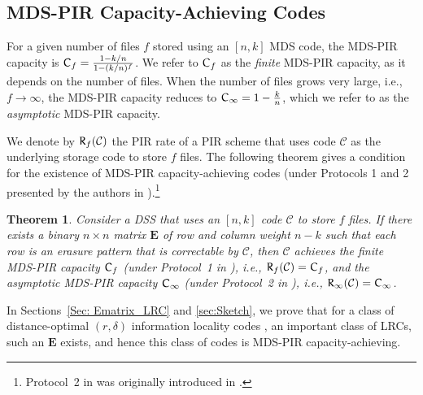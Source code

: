 \documentclass[twocolumn,conference]{IEEEtran}
\newtheorem{theorem}{Theorem}
\newcommand{\code}[1]{\mathcal{#1}}          %
\newcommand{\const}[1]{\textnormal{\usefont{U}{eur}{m}{n}\selectfont #1}} %
\begin{document}
\subsection{MDS-PIR Capacity-Achieving Codes}
\label{sec:CapAch}

For a given number of files $f$ stored using an $[n,k]$ MDS code, the MDS-PIR capacity \cite[Thm.~1]{BanawanUlukus18_1}  is 
$\const{C}_f = \frac{1-k/n}{1-(k/n)^f}$. We refer to $\const{C}_f$ as the \emph{finite} MDS-PIR capacity, as it depends on the number of files. 
When the number of files grows very large, i.e., $f\rightarrow\infty$, the MDS-PIR capacity reduces to
$\const{C}_\infty = 1-\frac{k}{n}$,
which we refer to as the \emph{asymptotic} MDS-PIR capacity.

We denote by $\const{R}_f(\code{C})$ the PIR rate of a PIR scheme that uses code $\mathcal C$ as the underlying storage code to store $f$ files.
The following theorem gives a condition for the existence of MDS-PIR capacity-achieving codes (under Protocols 1 and 2 presented by the authors in \cite{KumarLinRosnesGraell17_1sub}).\footnote{Protocol~2 in \cite{KumarLinRosnesGraell17_1sub} was originally introduced in \cite{Kum17b}.} 
\begin{theorem}\label{Th:CapAch}
 Consider a DSS that uses an $[n,k]$ code $\mathcal C$ to store $f$ files. If there exists a binary $n\times n$ matrix $\bm E$ of  row and column weight $n-k$ such that each row is an erasure pattern that is correctable  by $\mathcal C$, then $\mathcal C$ achieves the finite MDS-PIR capacity $\const{C}_f$ (under Protocol~1 in \cite{KumarLinRosnesGraell17_1sub}), i.e.,
    $\const{R}_f(\code{C}) = \const{C}_f$,
and the asymptotic MDS-PIR capacity $\const{C}_\infty$ (under Protocol~2 in \cite{KumarLinRosnesGraell17_1sub}), i.e.,
    $\const{R}_\infty(\code{C}) = \const{C}_\infty$.
\end{theorem}


In Sections~\ref{Sec: Ematrix_LRC} and \ref{sec:Sketch}, we prove that for a class of 
distance-optimal $(r,\delta)$ information locality codes \cite{Kam14}, an important class of LRCs, such an $\bm E$ exists, and hence this class of codes is MDS-PIR capacity-achieving.
\end{document}

